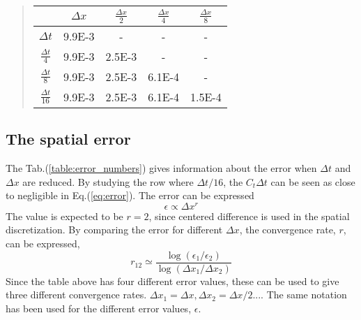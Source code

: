 \documentclass[%
twoside,                 %
final,                   %
chapterprefix=true,      %
open=right               %
10pt]{book}
\begin{document}
\label{table:error_numbers}

\begin{quote}
\begin{tabular}{ccccc}
\hline
\multicolumn{1}{c}{  } & \multicolumn{1}{c}{ $\Delta x$ } & \multicolumn{1}{c}{ $\frac{\Delta x}{2}$ } & \multicolumn{1}{c}{ $\frac{\Delta x}{4}$ } & \multicolumn{1}{c}{ $\frac{\Delta x}{8}$ } \\
\hline
$\Delta t     $       & 9.9E-3     & -                    & -                    & -                    \\
$\frac{\Delta t}{4} $ & 9.9E-3     & 2.5E-3               & -                    & -                    \\
$\frac{\Delta t}{8} $ & 9.9E-3     & 2.5E-3               & 6.1E-4               & -                    \\
$\frac{\Delta t}{16}$ & 9.9E-3     & 2.5E-3               & 6.1E-4               & 1.5E-4               \\
\hline
\end{tabular}
\end{quote}

\noindent

\subsection{The spatial error}
The Tab.(\ref{table:error_numbers}) gives information about the error when $\Delta t$ and $\Delta x$ are reduced. By studying the row where $\Delta t/16$, the $C_t \Delta t$ can be seen as close to negligible in Eq.(\ref{eq:error}). The error can be expressed 
\begin{equation}
    \epsilon \propto \Delta x^r
\end{equation}
The value is expected to be $r=2$, since centered difference is used in the spatial discretization. By comparing the error for different $\Delta x$, the convergence rate, $r$, can be expressed, 
\begin{equation} \label{eq:conv_rate}
 r_{12} \simeq \frac{\log(\epsilon_1/\epsilon_2)}{\log(\Delta x_1/\Delta x_2)}
\end{equation}
Since the table above has four different error values, these can be used to give three different convergence rates. $\Delta x_1 = \Delta x, \Delta x_2 = \Delta x/2...$. The same notation has been used for the different error values, $\epsilon$.
\end{document}
